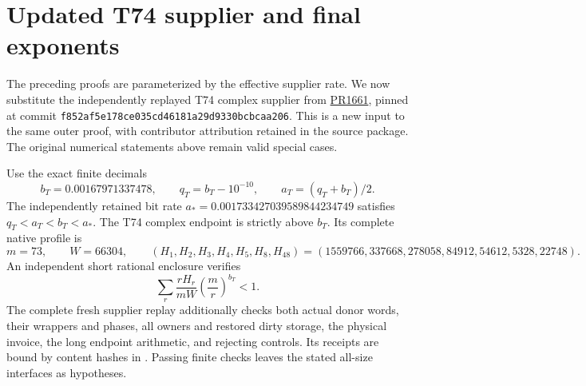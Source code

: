 \section{Updated T74 supplier and final exponents}\label{sec:t74}

The preceding proofs are parameterized by the effective supplier rate. We now substitute the independently replayed T74 complex supplier from \href{https://github.com/CrocSwap/integer-mult-bounds/pull/1661}{PR1661}, pinned at commit \texttt{f852af5e178ce035cd46181a29d9330bcbcaa206}. This is a new input to the same outer proof, with contributor attribution retained in the source package. The original numerical statements above remain valid special cases.

Use the exact finite decimals
\[
 b_T=0.00167971337478,\qquad q_T=b_T-10^{-10},
 \qquad a_T=(q_T+b_T)/2.
\]
The independently retained bit rate $a_*=0.001733427039589844234749$ satisfies $q_T<a_T<b_T<a_*$. The T74 complex endpoint is strictly above $b_T$. Its complete native profile is
\[
 m=73,\qquad W=66304,\qquad
 (H_1,H_2,H_3,H_4,H_5,H_8,H_{48})=
 (1559766,337668,278058,84912,54612,5328,22748).
\]
An independent short rational enclosure verifies
\[
 \sum_r\frac{rH_r}{mW}\left(\frac mr\right)^{b_T}<1.
\]
The complete fresh supplier replay additionally checks both actual donor words, their wrappers and phases, all owners and restored dirty storage, the physical invoice, the long endpoint arithmetic, and rejecting controls. Its receipts are bound by content hashes in . Passing finite checks leaves the stated all-size interfaces as hypotheses.

